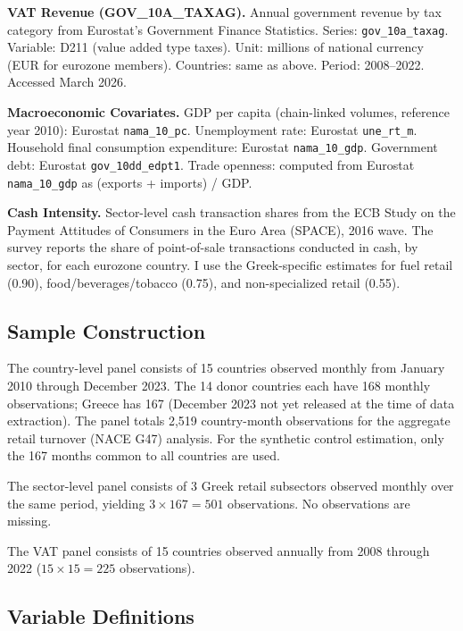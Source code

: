 \documentclass[12pt]{article}
\begin{document}
\textbf{VAT Revenue (GOV\_10A\_TAXAG).} Annual government revenue by tax category from Eurostat's Government Finance Statistics. Series: \texttt{gov\_10a\_taxag}. Variable: D211 (value added type taxes). Unit: millions of national currency (EUR for eurozone members). Countries: same as above. Period: 2008--2022. Accessed March 2026.

\textbf{Macroeconomic Covariates.} GDP per capita (chain-linked volumes, reference year 2010): Eurostat \texttt{nama\_10\_pc}. Unemployment rate: Eurostat \texttt{une\_rt\_m}. Household final consumption expenditure: Eurostat \texttt{nama\_10\_gdp}. Government debt: Eurostat \texttt{gov\_10dd\_edpt1}. Trade openness: computed from Eurostat \texttt{nama\_10\_gdp} as (exports + imports) / GDP.

\textbf{Cash Intensity.} Sector-level cash transaction shares from the ECB Study on the Payment Attitudes of Consumers in the Euro Area (SPACE), 2016 wave. The survey reports the share of point-of-sale transactions conducted in cash, by sector, for each eurozone country. I use the Greek-specific estimates for fuel retail (0.90), food/beverages/tobacco (0.75), and non-specialized retail (0.55).

\subsection{Sample Construction}

The country-level panel consists of 15 countries observed monthly from January 2010 through December 2023. The 14 donor countries each have 168 monthly observations; Greece has 167 (December 2023 not yet released at the time of data extraction). The panel totals 2,519 country-month observations for the aggregate retail turnover (NACE G47) analysis. For the synthetic control estimation, only the 167 months common to all countries are used.

The sector-level panel consists of 3 Greek retail subsectors observed monthly over the same period, yielding $3 \times 167 = 501$ observations. No observations are missing.

The VAT panel consists of 15 countries observed annually from 2008 through 2022 ($15 \times 15 = 225$ observations).

\subsection{Variable Definitions}
\end{document}
